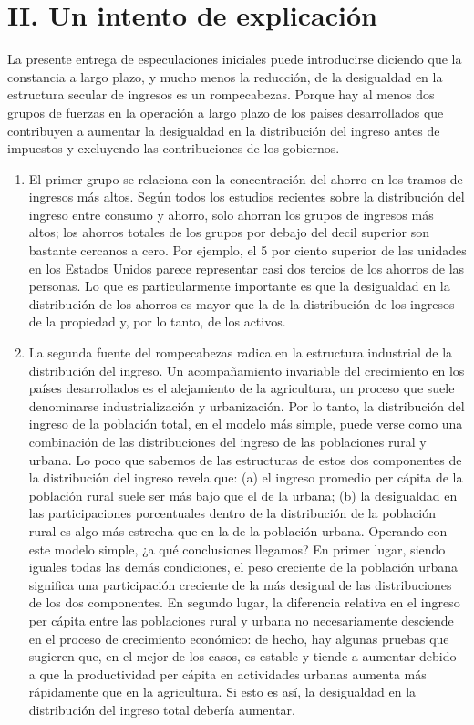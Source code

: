 \section*{II. \centering Un intento de explicación} 
La presente entrega de especulaciones iniciales puede introducirse diciendo que la constancia a largo plazo, y mucho menos la reducción, de la desigualdad en la estructura secular de ingresos es un rompecabezas. 
Porque hay al menos dos grupos de fuerzas en la operación a largo plazo de los países desarrollados que contribuyen a aumentar la desigualdad en la distribución del ingreso antes de impuestos y excluyendo las contribuciones de los gobiernos. 
\begin{enumerate}[1.]
    \item El primer grupo se relaciona con la concentración del ahorro en los tramos de ingresos más altos. Según todos los estudios recientes sobre la distribución del ingreso entre consumo y ahorro, solo ahorran los grupos de ingresos más altos; los ahorros totales de los grupos por debajo del decil superior son bastante cercanos a cero. Por ejemplo, el 5 por ciento superior de las unidades en los Estados Unidos parece representar casi dos tercios de los ahorros de las personas. Lo que es particularmente importante es que la desigualdad en la distribución de los ahorros es mayor que la de la distribución de los ingresos de la propiedad y, por lo tanto, de los activos. 
    \item La segunda fuente del rompecabezas radica en la estructura industrial de la distribución del ingreso. Un acompañamiento invariable del crecimiento en los países desarrollados es el alejamiento de la agricultura, un proceso que suele denominarse industrialización y urbanización. Por lo tanto, la distribución del ingreso de la población total, en el modelo más simple, puede verse como una combinación de las distribuciones del ingreso de las poblaciones rural y urbana. Lo poco que sabemos de las estructuras de estos dos componentes de la distribución del ingreso revela que: (a) el ingreso promedio per cápita de la población rural suele ser más bajo que el de la urbana; (b) la desigualdad en las participaciones porcentuales dentro de la distribución de la población rural es algo más estrecha que en la de la población urbana. Operando con este modelo simple, ¿a qué conclusiones llegamos? En primer lugar, siendo iguales todas las demás condiciones, el peso creciente de la población urbana significa una participación creciente de la más desigual de las distribuciones de los dos componentes. En segundo lugar, la diferencia relativa en el ingreso per cápita entre las poblaciones rural y urbana no necesariamente desciende en el proceso de crecimiento económico: de hecho, hay algunas pruebas que sugieren que, en el mejor de los casos, es estable y tiende a aumentar debido a que la productividad per cápita en actividades urbanas aumenta más rápidamente que en la agricultura. Si esto es así, la desigualdad en la distribución del ingreso total debería aumentar.\\
\end{enumerate}
